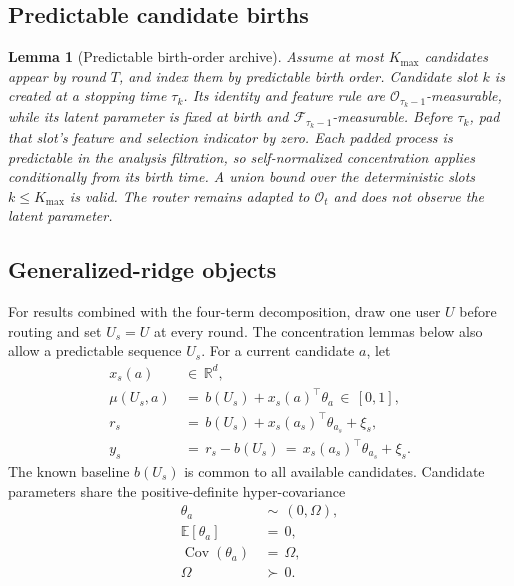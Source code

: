 \documentclass{article} %
\newtheorem{lemma}[theorem]{Lemma}
\begin{document}
\subsection{Predictable candidate births}

\begin{lemma}[Predictable birth-order archive]
\label{lem:predictable}
Assume at most $K_{\max}$ candidates appear by round $T$, and index them by predictable birth order. Candidate slot $k$ is created at a stopping time $\tau_k$. Its identity and feature rule are $\mathcal O_{\tau_k-1}$-measurable, while its latent parameter is fixed at birth and $\mathcal F_{\tau_k-1}$-measurable. Before $\tau_k$, pad that slot's feature and selection indicator by zero. Each padded process is predictable in the analysis filtration, so self-normalized concentration applies conditionally from its birth time. A union bound over the deterministic slots $k\le K_{\max}$ is valid. The router remains adapted to \(\mathcal O_t\) and does not observe the latent parameter.
\end{lemma}

\subsection{Generalized-ridge objects}

For results combined with the four-term decomposition, draw one user \(U\)
before routing and set \(U_s=U\) at every round. The concentration lemmas below
also allow a predictable sequence \(U_s\). For a current candidate \(a\), let
\begin{align}
x_s(a)
&\,\in\,
\mathbb R^d,
\label{eq:hyper-feature}
\\
\mu(U_s,a)
&\,=\,
b(U_s)+x_s(a)^\top\theta_a
\,\in\,
[0,1],
\label{eq:hyper-linear-model-app}
\\
r_s
&\,=\,
b(U_s)+x_s(a_s)^\top\theta_{a_s}+\xi_s,
\label{eq:hyper-reward}
\\
y_s
&\,=\,
r_s-b(U_s)
\,=\,
x_s(a_s)^\top\theta_{a_s}+\xi_s.
\label{eq:hyper-centered-reward}
\end{align}
The known baseline \(b(U_s)\) is common to all available candidates.
Candidate parameters share the positive-definite hyper-covariance
\begin{align}
\theta_a
&\,\sim\,
(0,\Omega),
\label{eq:hyper-random-effects}
\\
\mathbb E[\theta_a]
&\,=\,
0,
\label{eq:hyper-random-effects-mean}
\\
\operatorname{Cov}(\theta_a)
&\,=\,
\Omega,
\label{eq:hyper-random-effects-cov}
\\
\Omega
&\,\succ\,
0.
\label{eq:hyper-omega-pd}
\end{align}
\end{document}
